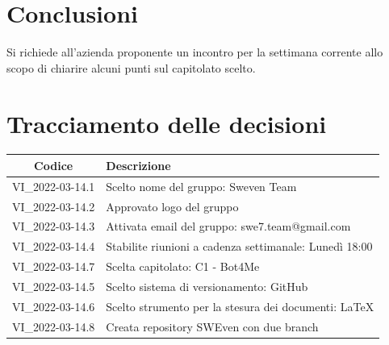 \documentclass[12pt, a4paper,table]{article}
\begin{document}
	\section{Conclusioni}
	Si richiede all'azienda proponente un incontro per la settimana corrente allo scopo di chiarire alcuni punti sul capitolato scelto.
	\newpage
	\section*{Tracciamento delle decisioni}
	\begin{tabular}{ |c|l| }
		\hline
		\textbf{Codice} & \textbf{Descrizione} \\
		\hline
		VI\_2022-03-14.1 & Scelto nome del gruppo: Sweven Team \\ \hline
		VI\_2022-03-14.2 & Approvato logo del gruppo\\ \hline
		VI\_2022-03-14.3 & Attivata email del gruppo: swe7.team@gmail.com\\ \hline
		VI\_2022-03-14.4 & Stabilite riunioni a cadenza settimanale: Lunedì 18:00\\ \hline
        VI\_2022-03-14.7 & Scelta capitolato: C1 - Bot4Me\\ \hline
		VI\_2022-03-14.5 & Scelto sistema di versionamento: GitHub\\ \hline
		VI\_2022-03-14.6 & Scelto strumento per la stesura dei documenti: \LaTeX\\ \hline
        VI\_2022-03-14.8 & Creata repository SWEven con due branch\\
		\hline
	\end{tabular}
\end{document}
